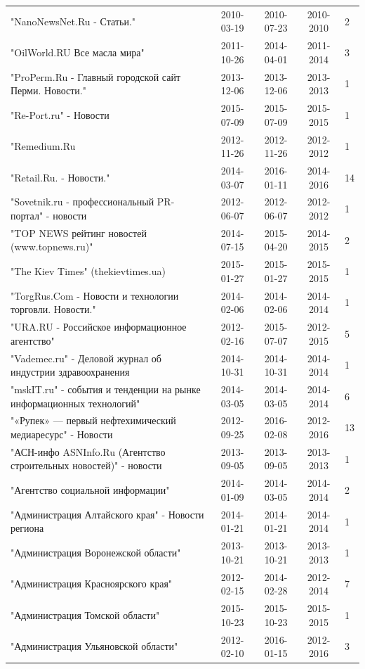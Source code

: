 \begin{longtable}{p{6cm}cccp{2cm}}
"NanoNewsNet.Ru - Статьи." & 2010-03-19 & 2010-07-23 & 2010-2010 & 2\\
"OilWorld.RU Все масла мира" & 2011-10-26 & 2014-04-01 & 2011-2014 & 3\\
"ProPerm.Ru - Главный городской сайт Перми. Новости." & 2013-12-06 & 2013-12-06 & 2013-2013 & 1\\
"Re-Port.ru" - Новости & 2015-07-09 & 2015-07-09 & 2015-2015 & 1\\
"Remedium.Ru & 2012-11-26 & 2012-11-26 & 2012-2012 & 1\\
"Retail.Ru. - Новости." & 2014-03-07 & 2016-01-11 & 2014-2016 & 14\\
"Sovetnik.ru - профессиональный PR-портал" - новости & 2012-06-07 & 2012-06-07 & 2012-2012 & 1\\
"TOP NEWS рейтинг новостей (www.topnews.ru)" & 2014-07-15 & 2015-04-20 & 2014-2015 & 2\\
"The Kiev Times" (thekievtimes.ua) & 2015-01-27 & 2015-01-27 & 2015-2015 & 1\\
"TorgRus.Com - Новости и технологии торговли. Новости." & 2014-02-06 & 2014-02-06 & 2014-2014 & 1\\
"URA.RU - Российское информационное агентство" & 2012-02-16 & 2015-07-07 & 2012-2015 & 5\\
"Vademec.ru" - Деловой журнал об индустрии здравоохранения & 2014-10-31 & 2014-10-31 & 2014-2014 & 1\\
"mskIT.ru" - события и тенденции на рынке информационных технологий" & 2014-03-05 & 2014-03-05 & 2014-2014 & 6\\
"«Рупек» — первый нефтехимический медиаресурс" - Новости & 2012-09-25 & 2016-02-08 & 2012-2016 & 13\\
"АСН-инфо ASNInfo.Ru (Агентство строительных новостей)" - новости & 2013-09-05 & 2013-09-05 & 2013-2013 & 1\\
"Агентство социальной информации" & 2014-01-09 & 2014-03-05 & 2014-2014 & 2\\
"Администрация Алтайского края" - Новости региона & 2014-01-21 & 2014-01-21 & 2014-2014 & 1\\
"Администрация Воронежской области" & 2013-10-21 & 2013-10-21 & 2013-2013 & 1\\
"Администрация Красноярского края" & 2012-02-15 & 2014-02-28 & 2012-2014 & 7\\
"Администрация Томской области" & 2015-10-23 & 2015-10-23 & 2015-2015 & 1\\
"Администрация Ульяновской области" & 2012-02-10 & 2016-01-15 & 2012-2016 & 3\\

\end{longtable}
